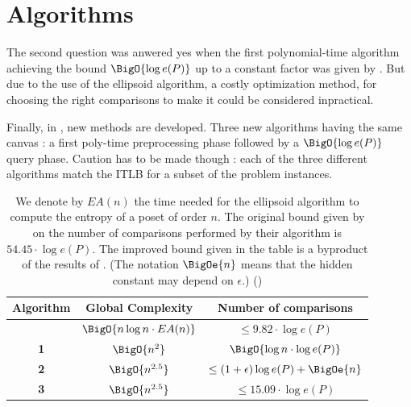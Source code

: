 \section{Algorithms}


The second question was anwered yes when the first polynomial-time algorithm achieving the bound $\BigO{\log e(P)}$ up to a constant factor was given by \cite{kahnkim1}. But due to the use of the ellipsoid algorithm, a costly optimization method, for choosing the right comparisons to make it could be considered inpractical.

Finally, in \cite{cardinal2013sorting}, new methods are developed. Three new algorithms having the same canvas : a first poly-time preprocessing phase followed by a $\BigO{\log e(P)}$ query phase. Caution has to be made though : each of the three different algorithms match the ITLB for a subset of the problem instances.

\begin{table}
	\begin{center}
	\caption{We denote by $E A(n)$ the time needed for the ellipsoid algorithm to compute the entropy of a poset of order $n$. The original bound given by \cite{kahnkim1} on the number of comparisons performed by their algorithm is $54.45 \cdot \log e(P)$. The improved bound given in the table is a byproduct of the results of \cite{cardinal2013sorting}. (The notation $\BigOe{n}$ means that the hidden constant may depend on $\epsilon$.) (\cite{cardinal2013sorting})}
	\label{tree:supi:table/jcardin}
	\begin{tabular}{|c|c|c|}

	\hline
	Algorithm & Global Complexity & Number of comparisons\\\hline\hline
	\cite{kahnkim1} & $\BigO{n \log n \cdot E A(n)}$ & $\leq 9.82 \cdot \log e(P)$\\\hline\hline
	\cite{cardinal2013sorting} \textbf{1} & $ \BigO{n^{2}} $ & $\BigO{\log n \cdot \log e(P)}$ \\\hline
	\cite{cardinal2013sorting} \textbf{2} & $ \BigO{n^{2.5}} $ & $\leq (1 + \epsilon) \log e(P) + \BigOe{n}$ \\\hline
	\cite{cardinal2013sorting} \textbf{3} & $ \BigO{n^{2.5}} $ & $\leq 15.09 \cdot \log e(P)$ \\\hline

	\end{tabular}
	\end{center}
\end{table}


